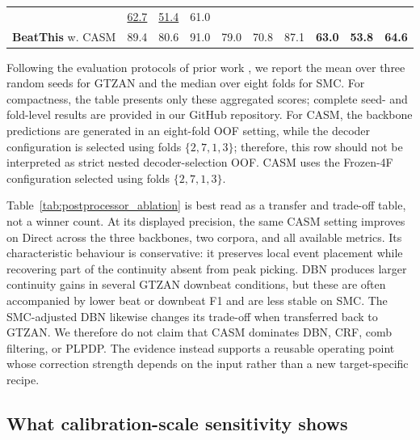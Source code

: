 \documentclass{article}
\begin{document}
\begin{table}[t]
{\begin{tabular}{l|ccc|ccc|ccc}
& \underline{62.7} & \underline{51.4} & 61.0 \\
\rowcolor{gray!10}
\textbf{BeatThis} w. CASM
& 89.4 & 80.6 & 91.0
& 79.0 & 70.8 & 87.1
& \textbf{63.0} & \textbf{53.8} & \textbf{64.6} \\
\bottomrule
\end{tabular}%
}
\vspace{2pt}
\begin{minipage}{0.99\columnwidth}
\footnotesize
Following the evaluation protocols of prior work
\cite{foscarin2024beat, ru2025hingenet, ru2025beatfm}, we report the mean over three random seeds for GTZAN and the median over eight folds for SMC. For compactness, the table presents only these aggregated scores; complete seed- and fold-level results are provided in our GitHub repository. For CASM, the backbone predictions are generated in an eight-fold OOF setting, while the decoder configuration is selected using folds $\{2,7,1,3\}$; therefore, this row should not be interpreted as strict nested decoder-selection OOF. CASM uses the Frozen-4F configuration selected using folds $\{2,7,1,3\}$.
\end{minipage}
\endgroup
\end{table}


Table~\ref{tab:postprocessor_ablation} is best read as a transfer and trade-off
table, not a winner count. At its displayed precision, the same CASM setting
improves on Direct across the three backbones, two corpora, and all available
metrics. Its characteristic behaviour is conservative: it preserves local
event placement while recovering part of the continuity absent from peak
picking. DBN produces larger continuity gains in several GTZAN downbeat
conditions, but these are often accompanied by lower beat or downbeat F1 and
are less stable on SMC. The SMC-adjusted DBN likewise changes its trade-off
when transferred back to GTZAN. We therefore do not claim that CASM dominates
DBN, CRF, comb filtering, or PLPDP. The evidence instead supports a reusable
operating point whose correction strength depends on the input rather than a
new target-specific recipe.


\subsection{What calibration-scale sensitivity shows}
\end{document}
